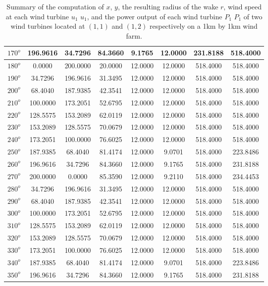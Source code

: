 \begin{table}[H]
\begin{tabular}{|c|c|c|c|c|c|c|c|}
$170^o$	&196.9616	&34.7296	&84.3660	&9.1765	&12.0000	&231.8188	&518.4000 \\ \hline
$180^o$	&0.0000	&200.0000	&20.0000	&12.0000	&12.0000	&518.4000	&518.4000 \\ \hline
$190^o$	&34.7296	&196.9616	&31.3495	&12.0000	&12.0000	&518.4000	&518.4000 \\ \hline
$200^o$	&68.4040	&187.9385	&42.3541	&12.0000	&12.0000	&518.4000	&518.4000 \\ \hline
$210^o$	&100.0000	&173.2051	&52.6795	&12.0000	&12.0000	&518.4000	&518.4000 \\ \hline
$220^o$	&128.5575	&153.2089	&62.0119	&12.0000	&12.0000	&518.4000	&518.4000 \\ \hline
$230^o$	&153.2089	&128.5575	&70.0679	&12.0000	&12.0000	&518.4000	&518.4000 \\ \hline
$240^o$	&173.2051	&100.0000	&76.6025	&12.0000	&12.0000	&518.4000	&518.4000 \\ \hline
$250^o$	&187.9385	&68.4040	&81.4174	&12.0000	&9.0701	&518.4000	&223.8486 \\ \hline
$260^o$	&196.9616	&34.7296	&84.3660	&12.0000	&9.1765	&518.4000	&231.8188 \\ \hline
$270^o$	&200.0000	&0.0000	&85.3590	&12.0000	&9.2110	&518.4000	&234.4453 \\ \hline
$280^o$	&34.7296	&196.9616	&31.3495	&12.0000	&12.0000	&518.4000	&518.4000 \\ \hline
$290^o$	&68.4040	&187.9385	&42.3541	&12.0000	&12.0000	&518.4000	&518.4000 \\ \hline
$300^o$	&100.0000	&173.2051	&52.6795	&12.0000	&12.0000	&518.4000	&518.4000 \\ \hline
$310^o$	&128.5575	&153.2089	&62.0119	&12.0000	&12.0000	&518.4000	&518.4000 \\ \hline
$320^o$	&153.2089	&128.5575	&70.0679	&12.0000	&12.0000	&518.4000	&518.4000 \\ \hline
$330^o$	&173.2051	&100.0000	&76.6025	&12.0000	&12.0000	&518.4000	&518.4000 \\ \hline
$340^o$	&187.9385	&68.4040	&81.4174	&12.0000	&9.0701	&518.4000	&223.8486 \\ \hline
$350^o$	&196.9616	&34.7296	&84.3660	&12.0000	&9.1765	&518.4000	&231.8188 \\ \hline
    \end{tabular}
    \caption{Summary of the computation of $x$, $y$, the resulting radius of the wake $r$, wind speed at each wind turbine $u_1$ $u_1$, and the power output of each wind turbine $P_1$ $P_1$ of two wind turbines located at $(1,1)$ and $(1,2)$ respectively on a 1km by 1km wind farm.}
    \label{summaryWorst2}
\end{table}
\doublespacing

